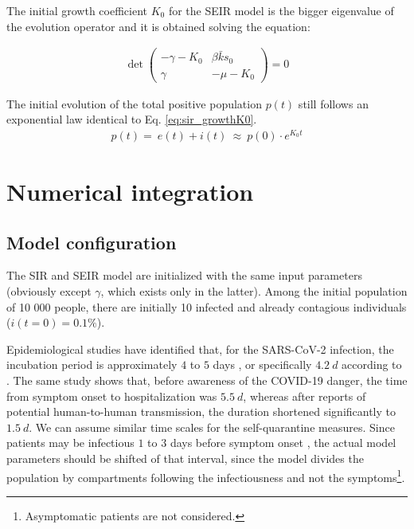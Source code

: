 \documentclass[DIV=12, BCOR=0pt]{scrartcl}  %
\begin{document}
The initial growth coefficient $K_0$ for the SEIR model is the bigger eigenvalue of the evolution operator and it is obtained solving the equation: 

	\begin{align}
		\det 
		\begin{pmatrix}
			- \gamma - K_0 & \beta \bar{k} s_0\\ %
			\gamma & - \mu - K_0  %
		\end{pmatrix} = 0
	\label{eq:seir_K0}
	\end{align}
 
 The initial evolution of the total positive population $p(t)$ still follows an exponential law identical to Eq. \ref{eq:sir_growthK0}.
 \begin{align}
		p(t) = \ e(t) + i(t) \ \approx \  p(0) \cdot e^{K_0 t}
 \end{align}
 
	\section{Numerical integration}
	\label{sec:numerical}
	
  \subsection{Model configuration}
	The SIR and SEIR model are initialized with the same input parameters (obviously except $\gamma$, which exists only in the latter). Among the initial population of 10 000 people, there are initially 10 infected and already contagious individuals ($i(t \! = \! 0) = 0.1 \%$).
	
	Epidemiological studies have identified that, for the SARS-CoV-2 infection, the incubation period is approximately $4$ to $5$ days \citep{Gandhi2020}, or specifically $4.2 \ d$ according to \citet{Sanche2020}. The same study shows that, before awareness of the COVID-19 danger, the time from symptom onset to hospitalization was $5.5 \ d$, whereas after reports of potential human-to-human transmission, the duration shortened significantly to $1.5 \ d$. We can assume similar time scales for the self-quarantine measures. Since patients may be infectious $1$ to $3$ days before symptom onset \citep{Gandhi2020}, the actual model parameters should be shifted of that interval, since the model divides the population by compartments following the infectiousness and not the symptoms\footnote{Asymptomatic patients are not considered.}.
	
\end{document}
